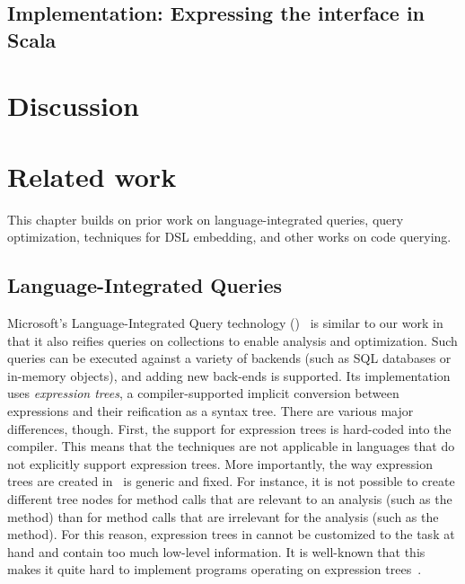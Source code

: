 

\section{Implementation: Expressing the interface in Scala}
\label{ch:aosd13-intfScala}
\label{sec:intfScala}





\chapter{Discussion}
\label{ch:aosd13-discussion}
\label{sec:discussion}


\chapter{Related work}
\label{ch:aosd13-relwork}
\label{sec:relwork}
This chapter builds on prior work on language-integrated queries, query optimization, techniques for DSL embedding, and other works on code querying.

\section{Language-Integrated Queries}
Microsoft's Language-Integrated Query technology (\LINQ)~\citep{Meijer:2006:LRO:1142473.1142552,Bierman:2007:LTF:1297027.1297063} is similar to our work in that it also
reifies queries on collections to enable analysis and optimization. Such queries can be executed against a variety of backends (such as SQL databases or in-memory objects), and adding new back-ends is supported. Its implementation uses \emph{expression trees}, a compiler-supported
implicit conversion between expressions and their reification as a syntax tree. There are various major differences, though.
First, the support for expression trees is hard-coded into the compiler. This means that the techniques are not applicable in languages
that do not explicitly support expression trees. More importantly, the way expression trees are created in \LINQ\ is generic and fixed.
For instance, it is not possible to create different tree nodes for method calls that are relevant to an analysis (such as the  method) than for method calls that are irrelevant for the analysis (such as the  method). For this reason, expression trees in \LINQ{}
cannot be customized to the task at hand and contain too much low-level information. It is well-known that this makes it quite hard to
implement programs operating on expression trees~\citep{Eini11Pain}.

